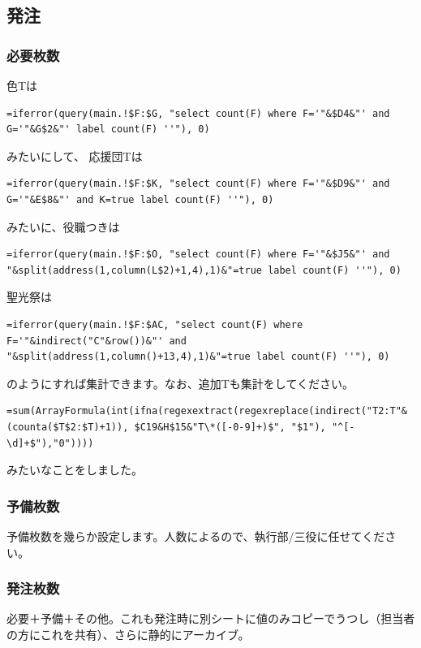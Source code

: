 \documentclass[dvipdfmx,jb5]{jreport}
\begin{document}
\subsection{発注}
\subsubsection{必要枚数}
色Tは

\begin{lstlisting}
=iferror(query(main.!$F:$G, "select count(F) where F='"&$D4&"' and G='"&G$2&"' label count(F) ''"), 0)
\end{lstlisting}

みたいにして、
応援団Tは

\begin{lstlisting}
=iferror(query(main.!$F:$K, "select count(F) where F='"&$D9&"' and G='"&E$8&"' and K=true label count(F) ''"), 0)
\end{lstlisting}

みたいに、役職つきは

\begin{lstlisting}
=iferror(query(main.!$F:$O, "select count(F) where F='"&$J5&"' and "&split(address(1,column(L$2)+1,4),1)&"=true label count(F) ''"), 0)
\end{lstlisting}

聖光祭は

\begin{lstlisting}
=iferror(query(main.!$F:$AC, "select count(F) where F='"&indirect("C"&row())&"' and "&split(address(1,column()+13,4),1)&"=true label count(F) ''"), 0)
\end{lstlisting}

のようにすれば集計できます。なお、追加Tも集計をしてください。

\begin{lstlisting}
=sum(ArrayFormula(int(ifna(regexextract(regexreplace(indirect("T2:T"&(counta($T$2:$T)+1)), $C19&H$15&"T\*([-0-9]+)$", "$1"), "^[-\d]+$"),"0"))))
\end{lstlisting}

みたいなことをしました。

\subsubsection{予備枚数}
予備枚数を幾らか設定します。人数によるので、執行部/三役に任せてください。

\subsubsection{発注枚数}
必要＋予備＋その他。これも発注時に別シートに値のみコピーでうつし（担当者の方にこれを共有）、さらに静的にアーカイブ。
\end{document}
